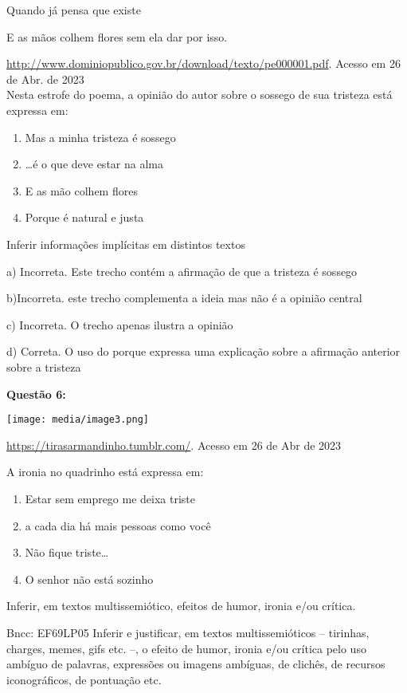 Quando já pensa que existe

E as mãos colhem flores sem ela dar por isso.

\href{http://www.dominiopublico.gov.br/download/texto/pe000001.pdf}{{http://www.dominiopublico.gov.br/download/texto/pe000001.pdf}}.
Acesso em 26 de Abr. de 2023\\
Nesta estrofe do poema, a opinião do autor sobre o sossego de sua
tristeza está expressa em:

\begin{enumerate}
\def\labelenumi{\alph{enumi})}
\item
  Mas a minha tristeza é sossego
\item
  \ldots é o que deve estar na alma
\item
  E as mão colhem flores
\item
  Porque é natural e justa
\end{enumerate}

Inferir informações implícitas em distintos textos

a) Incorreta. Este trecho contém a afirmação de que a tristeza é sossego

b)Incorreta. este trecho complementa a ideia mas não é a opinião central

c) Incorreta. O trecho apenas ilustra a opinião

d) Correta. O uso do porque expressa uma explicação sobre a afirmação
anterior sobre a tristeza

\textbf{Questão 6:}

\texttt{[image: media/image3.png]}

\href{https://tirasarmandinho.tumblr.com/}{{https://tirasarmandinho.tumblr.com/}}.
Acesso em 26 de Abr de 2023

A ironia no quadrinho está expressa em:

\begin{enumerate}
\def\labelenumi{\alph{enumi})}
\item
  Estar sem emprego me deixa triste
\item
  a cada dia há mais pessoas como você
\item
  Não fique triste\ldots{}
\item
  O senhor não está sozinho
\end{enumerate}

Inferir, em textos multissemiótico, efeitos de humor, ironia e/ou
crítica.

Bncc: EF69LP05 Inferir e justificar, em textos multissemióticos --
tirinhas, charges, memes, gifs etc. --, o efeito de humor, ironia e/ou
crítica pelo uso ambíguo de palavras, expressões ou imagens ambíguas, de
clichês, de recursos iconográficos, de pontuação etc.

